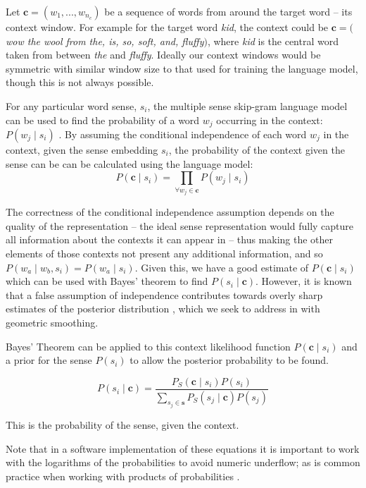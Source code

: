 \documentclass{sig-alternate}
\renewcommand{\c}{\mathbf{c}}
\newcommand{\s}{\mathbf{s}}
\begin{document}
Let $\c=(w_{1},...,w_{n_c})$ be a sequence of words from around the target word -- its context window.
For example for the target word \emph{kid}, the context could be $\c=($ \emph{ wow the wool from the, is, so, soft, and, fluffy}$)$, where \emph{kid} is the central word taken from between \emph{the} and \emph{fluffy}.
Ideally our context windows would be symmetric with similar window size to that used for training the language model, though this is not always possible.

For any particular word sense, $s_i$, the multiple sense skip-gram language model can be used to
find the probability of a word $w_j$ occurring in the context: $P(w_j \mid s_i)$
\parencite{tian2014probabilistic,AdaGrams}.
By assuming the conditional independence of each word $w_j$ in the context, given the sense embedding $s_i$, the probability of the context given the sense can be can be calculated using the language model:
\begin{equation} \label{eq:contextprobtrue}
P(\c \mid s_{i})=\prod_{\forall w_{j}\in\c}P(w_{j} \mid s_{i})
\end{equation}

The correctness of the conditional independence assumption depends on the quality of the representation -- the ideal sense representation would fully capture all information about the contexts it can appear in -- thus making the other elements of those contexts not present any additional information, and so  $P(w_a \mid w_b,s_i)=P(w_a \mid s_i)$. Given this, we have a good estimate of $P(\c \mid s_{i})$ which can be used with Bayes' theorem to find $P( s_i \mid \c)$. However, it is known that a false assumption of independence contributes towards overly sharp estimates of the posterior distribution \cite{rosenfeld2000two}, which we seek to address in  with geometric smoothing.


Bayes' Theorem can be applied to this context likelihood function  $P(\c \mid s_{i})$ and a prior for the sense $P(s_i)$ to allow the posterior probability to be found.

\begin{equation} \label{eq:generalwsd}
P(s_{i} \mid \c) =
\dfrac{P_S(\c \mid s_{i})P(s_{i})}
{\sum_{s_{j}\in\s} P_S(s_{j} \mid \c)P(s_{j})}
\end{equation}

This is the probability of the sense, given the context.

Note that in a software implementation of these equations it is important to work with the logarithms of the probabilities to avoid numeric underflow; as is common practice when working with products of probabilities \parencite{press2007numerical}.
\end{document}
